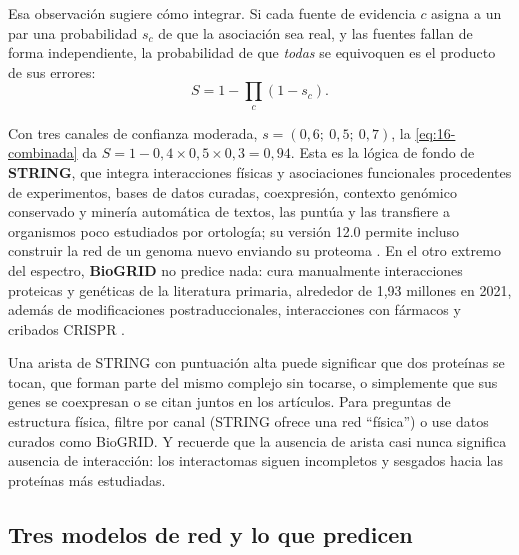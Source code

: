 Esa observación sugiere cómo integrar. Si cada fuente de evidencia $c$ asigna a un par una probabilidad $s_c$ de que la asociación sea real, y las fuentes fallan de forma independiente, la probabilidad de que \emph{todas} se equivoquen es el producto de sus errores:
\begin{equation}\label{eq:16-combinada}
S = 1-\prod_{c}\left(1-s_c\right).
\end{equation}
\begin{simbolos}
\end{simbolos}
Con tres canales de confianza moderada, $s=(0{,}6;\ 0{,}5;\ 0{,}7)$, la \cref{eq:16-combinada} da $S=1-0{,}4\times0{,}5\times0{,}3=0{,}94$. Esta es la lógica de fondo de \textbf{STRING}, que integra interacciones físicas y asociaciones funcionales procedentes de experimentos, bases de datos curadas, coexpresión, contexto genómico conservado y minería automática de textos, las puntúa y las transfiere a organismos poco estudiados por ortología; su versión 12.0 permite incluso construir la red de un genoma nuevo enviando su proteoma \parencite{c16-szklarczyk2023}. En el otro extremo del espectro, \textbf{BioGRID} no predice nada: cura manualmente interacciones proteicas y genéticas de la literatura primaria, alrededor de 1,93 millones en 2021, además de modificaciones postraduccionales, interacciones con fármacos y cribados CRISPR \parencite{c16-oughtred2021}.

\begin{cuidado}
Una arista de STRING con puntuación alta puede significar que dos proteínas se tocan, que forman parte del mismo complejo sin tocarse, o simplemente que sus genes se coexpresan o se citan juntos en los artículos. Para preguntas de estructura física, filtre por canal (STRING ofrece una red ``física'') o use datos curados como BioGRID. Y recuerde que la ausencia de arista casi nunca significa ausencia de interacción: los interactomas siguen incompletos y sesgados hacia las proteínas más estudiadas.
\end{cuidado}

\subsection{Tres modelos de red y lo que predicen}

